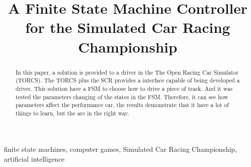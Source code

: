 \documentclass[journal]{IEEEtran}%
\begin{document}
	\title{A Finite State Machine Controller for the Simulated Car Racing Championship}

\author{
	}

%
{}%

\maketitle

\begin{abstract}
In this paper, a solution is provided to a driver in the The Open Racing Car Simulator (TORCS). The TORCS plus the SCR provides a interface capable of being developed a driver. This solution have a FSM to choose how to drive a piece of track. And it was tested the parameters changing of the states in the FSM. Therefore, it can see how parameters affect the performance car, the results demonstrate that it have a lot of things to learn, but the are in the right way.
\end{abstract}

\begin{IEEEkeywords}
finite state machines, computer games, Simulated Car Racing Championship, artificial intelligence
\end{IEEEkeywords}%

%
%
%
%
%
%
%

%
%
\end{document}
